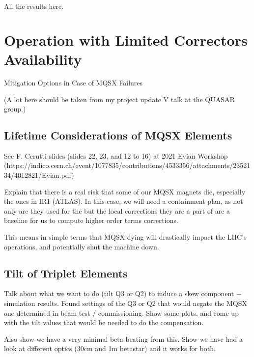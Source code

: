 All the results here.



\section{Operation with Limited Correctors Availability}

Mitigation Options in Case of MQSX Failures

(A lot here should be taken from my project update V talk at the QUASAR group.)

\subsection{Lifetime Considerations of MQSX Elements}

See F. Cerutti slides (slides 22, 23, and 12 to 16) at 2021 Evian Workshop
(https://indico.cern.ch/event/1077835/contributions/4533356/attachments/2352134/4012821/Evian.pdf)

Explain that there is a real risk that some of our MQSX magnets die, especially the ones in IR1 (ATLAS).
In this case, we will need a containment plan, as not only are they used for the but the local corrections they are a part of are a baseline for us to compute higher order terms corrections.


This means in simple terms that MQSX dying will drastically impact the LHC's operations, and potentially shut the machine down.

\subsection{Tilt of Triplet Elements}

Talk about what we want to do (tilt Q3 or Q2) to induce a skew component + simulation results.
Found settings of the Q3 or Q2 that would negate the MQSX one determined in beam test / commissioning.
Show some plots, and come up with the tilt values that would be needed to do the compensation.

Also show we have a very minimal beta-beating from this.
Show we have had a look at different optics (30cm and 1m betastar) and it works for both.

